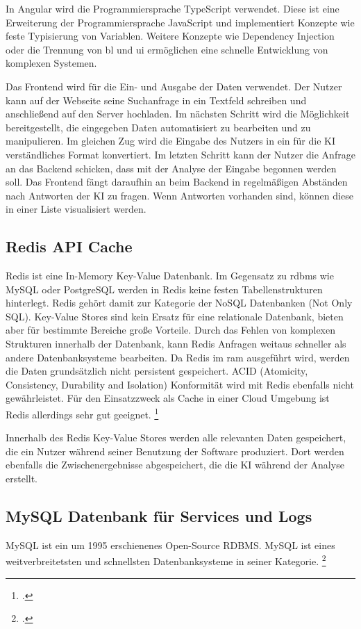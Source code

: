 In Angular wird die Programmiersprache TypeScript verwendet. Diese ist eine Erweiterung der Programmiersprache JavaScript und implementiert Konzepte wie feste Typisierung von Variablen. Weitere Konzepte wie Dependency Injection oder die Trennung von \ac{bl} und \ac{ui} ermöglichen eine schnelle Entwicklung von komplexen Systemen. 

Das Frontend wird für die Ein- und Ausgabe der Daten verwendet. Der Nutzer kann auf der Webseite seine Suchanfrage in ein Textfeld schreiben und anschließend auf den Server hochladen. Im nächsten Schritt wird die Möglichkeit bereitgestellt, die eingegeben Daten automatisiert zu bearbeiten und zu manipulieren. Im gleichen Zug wird die Eingabe des Nutzers in ein für die KI verständliches Format konvertiert. Im letzten Schritt kann der Nutzer die Anfrage an das Backend schicken, dass mit der Analyse der Eingabe begonnen werden soll. Das Frontend fängt daraufhin an beim Backend in regelmäßigen Abständen nach Antworten der KI zu fragen. Wenn Antworten vorhanden sind, können diese in einer Liste visualisiert werden.

\subsection{Redis API Cache}
Redis ist eine In-Memory Key-Value Datenbank. Im Gegensatz zu \ac{rdbms} wie MySQL oder PostgreSQL werden in Redis keine festen Tabellenstrukturen hinterlegt. Redis gehört damit zur Kategorie der NoSQL Datenbanken (Not Only SQL). Key-Value Stores sind kein Ersatz für eine relationale Datenbank, bieten aber für bestimmte Bereiche große Vorteile. Durch das Fehlen von komplexen Strukturen innerhalb der Datenbank, kann Redis Anfragen weitaus schneller als andere Datenbanksysteme bearbeiten. Da Redis im \ac{ram} ausgeführt wird,  werden die Daten grundsätzlich nicht persistent gespeichert. ACID (Atomicity, Consistency, Durability and Isolation) Konformität wird mit Redis ebenfalls nicht gewährleistet. Für den Einsatzzweck als Cache in einer Cloud Umgebung ist Redis allerdings sehr gut geeignet. \footcite{paksula2010persisting}

Innerhalb des Redis Key-Value Stores werden alle relevanten Daten gespeichert, die ein Nutzer während seiner Benutzung der Software produziert. Dort werden ebenfalls die Zwischenergebnisse abgespeichert, die die KI während der Analyse erstellt.

\subsection{MySQL Datenbank für Services und Logs}
MySQL ist ein um 1995 erschienenes Open-Source RDBMS. MySQL ist eines weitverbreitetsten und schnellsten Datenbanksysteme in seiner Kategorie. \footcite{dubois2008mysql}

